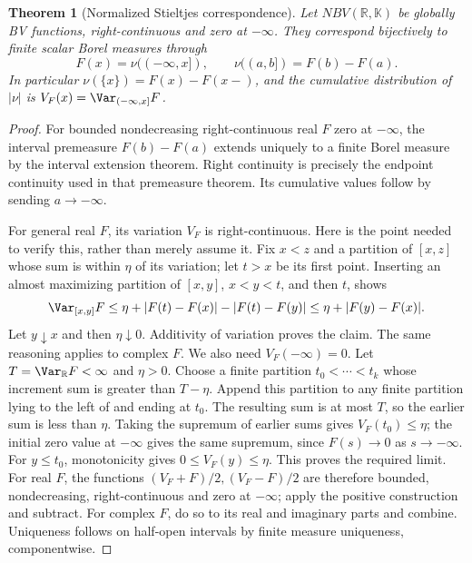\documentclass[11pt,oneside,openany]{book}
\newtheorem{theorem}{Theorem}[chapter]
\theoremstyle{definition}
\theoremstyle{remark}
\newcommand{\R}{\mathbb R}\newcommand{\C}{\mathbb C}
\newcommand{\family}[1]{}
\begin{document}
\begin{theorem}[Normalized Stieltjes correspondence]\family{D11.12.normalized_stieltjes}\label{d11:12:normalized-stieltjes}
Let $NBV(\R,\mathbb K)$ be globally BV functions, right-continuous and
zero at $-\infty$. They correspond bijectively to finite scalar Borel
measures through
\[
 F(x)=\nu(( -\infty,x]),\qquad \nu((a,b])=F(b)-F(a).
\]
In particular $\nu(\{x\})=F(x)-F(x-)$, and the cumulative distribution
of $|\nu|$ is $V_F(x)=\Var_{(-\infty,x]}F$.
\end{theorem}
\begin{proof}
For bounded nondecreasing right-continuous real $F$ zero at $-\infty$,
the interval premeasure $F(b)-F(a)$ extends uniquely to a finite Borel
measure by the interval extension theorem. Right continuity is precisely
the endpoint continuity used in that premeasure theorem. Its cumulative
values follow by sending $a\to-\infty$.

For general real $F$, its variation $V_F$ is right-continuous. Here is the
point needed to verify this, rather than merely assume it. Fix $x<z$ and
a partition of $[x,z]$ whose sum is within $\eta$ of its variation; let
$t>x$ be its first point. Inserting an almost maximizing partition of
$[x,y]$, $x<y<t$, and then $t$, shows
\[
 \Var_{[x,y]}F\leq\eta+|F(t)-F(x)|-|F(t)-F(y)|
 \leq\eta+|F(y)-F(x)|.
\]
Let $y\downarrow x$ and then $\eta\downarrow0$. Additivity of variation
proves the claim. The same reasoning applies to complex $F$.
We also need $V_F(-\infty)=0$. Let $T=\Var_\R F<\infty$ and
$\eta>0$. Choose a finite partition $t_0<\cdots<t_k$ whose increment
sum is greater than $T-\eta$. Append this partition to any finite
partition lying to the left of and ending at $t_0$. The resulting sum
is at most $T$, so the earlier sum is less than $\eta$. Taking the
supremum of earlier sums gives $V_F(t_0)\leq\eta$; the initial
zero value at $-\infty$ gives the same supremum, since $F(s)\to0$ as
$s\to-\infty$. For $y\leq t_0$, monotonicity gives
$0\leq V_F(y)\leq\eta$. This proves the required limit.
For real $F$, the functions $(V_F+F)/2,(V_F-F)/2$ are therefore bounded,
nondecreasing, right-continuous and zero at $-\infty$; apply the positive
construction and subtract. For complex $F$, do so to its real and imaginary
parts and combine. Uniqueness follows on half-open intervals by finite
measure uniqueness, componentwise.


\end{proof}
\end{document}
